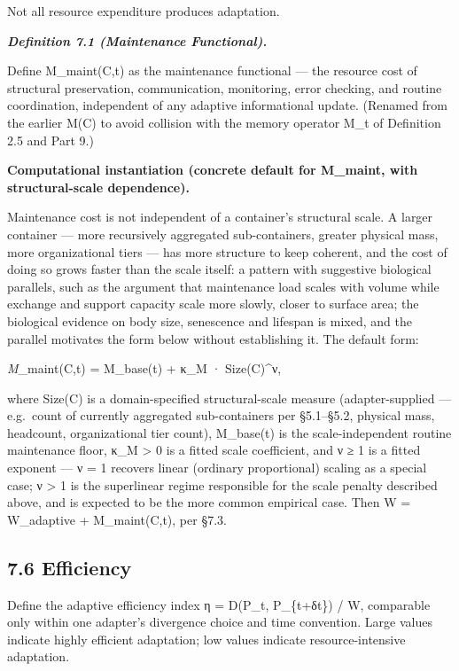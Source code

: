 \documentclass[
]{article}
\begin{document}
Not all resource expenditure produces adaptation.

\emph{\textbf{Definition 7.1 (Maintenance Functional).}}

Define M\_maint(C,t) as the maintenance functional --- the resource cost
of structural preservation, communication, monitoring, error checking,
and routine coordination, independent of any adaptive informational
update. (Renamed from the earlier M(C) to avoid collision with the
memory operator M\_t of Definition 2.5 and Part 9.)

\textbf{Computational instantiation (concrete default for M\_maint, with
structural-scale dependence).}

Maintenance cost is not independent of a container's structural scale. A
larger container --- more recursively aggregated sub-containers, greater
physical mass, more organizational tiers --- has more structure to keep
coherent, and the cost of doing so grows faster than the scale itself: a
pattern with suggestive biological parallels, such as the argument that
maintenance load scales with volume while exchange and support capacity
scale more slowly, closer to surface area; the biological evidence on
body size, senescence and lifespan is mixed, and the parallel motivates
the form below without establishing it. The default form:

\emph{M}\_maint(C,t) = M\_base(t) + κ\_M · Size(C)\^{}ν,

where Size(C) is a domain-specified structural-scale measure
(adapter-supplied --- e.g.~count of currently aggregated sub-containers
per §5.1--§5.2, physical mass, headcount, organizational tier count),
M\_base(t) is the scale-independent routine maintenance floor, κ\_M
\textgreater{} 0 is a fitted scale coefficient, and ν ≥ 1 is a fitted
exponent --- ν = 1 recovers linear (ordinary proportional) scaling as a
special case; ν \textgreater{} 1 is the superlinear regime responsible
for the scale penalty described above, and is expected to be the more
common empirical case. Then W = W\_adaptive + M\_maint(C,t), per §7.3.

\hypertarget{efficiency}{%
\subsection{7.6 Efficiency}\label{efficiency}}

Define the adaptive efficiency index η = D(P\_t, P\_\{t+δt\}) / W,
comparable only within one adapter's divergence choice and time
convention. Large values indicate highly efficient adaptation; low
values indicate resource-intensive adaptation.
\end{document}
